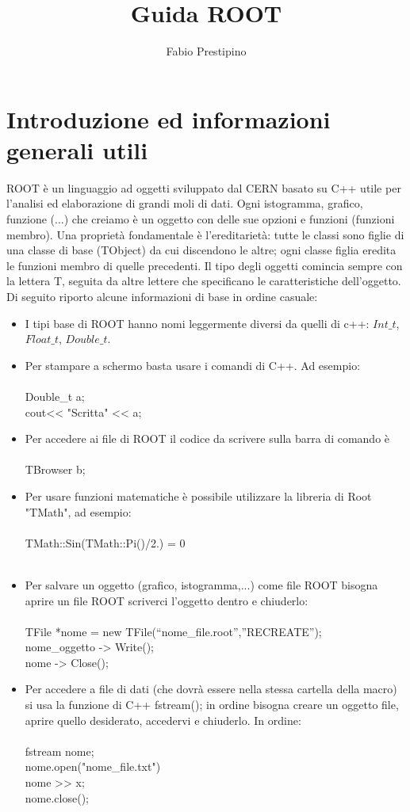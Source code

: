 \documentclass[10pt,a4paper]{article}
\author{Fabio Prestipino}
\title{Guida ROOT}
\begin{document}
	
	\maketitle
	\tableofcontents
	\newpage
\section{Introduzione ed informazioni generali utili}
ROOT è un linguaggio ad oggetti sviluppato dal CERN basato su C++ utile per l'analisi ed elaborazione di grandi moli di dati. Ogni istogramma, grafico, funzione (...) che creiamo è un oggetto con delle sue opzioni e funzioni (funzioni membro). Una proprietà fondamentale è l'ereditarietà: tutte le classi sono figlie di una classe di base (TObject) da cui discendono le altre; ogni classe figlia eredita le funzioni membro di quelle precedenti. Il tipo degli oggetti comincia sempre con la lettera T, seguita da altre lettere che specificano le caratteristiche dell'oggetto. Di seguito riporto alcune informazioni di base in ordine casuale:
\begin{itemize}
\item I tipi base di ROOT hanno nomi leggermente diversi da quelli di c++: \(Int\_t\), \(Float\_t\), \(Double\_t\).\\
\item Per stampare a schermo basta usare i comandi di C++. Ad esempio:\\\\
Double\_t a;\\
cout<< "Scritta" << a;\\
\item Per accedere ai file di ROOT il codice da scrivere sulla barra di comando è\\\\
TBrowser b;\\
\item Per usare funzioni matematiche è possibile utilizzare la libreria di Root "TMath", ad esempio:\\\\
TMath::Sin(TMath::Pi()/2.) = 0\\\\ 
\item Per salvare un oggetto (grafico, istogramma,...) come file ROOT bisogna aprire un file ROOT scriverci l'oggetto dentro e chiuderlo:\\\\
TFile *nome = new TFile(“nome\_file.root”,”RECREATE”);\\
nome\_oggetto -> Write();\\
nome -> Close();\\
\item Per accedere a file di dati (che dovrà essere nella stessa cartella della macro) si usa la funzione di C++ fstream(); in ordine bisogna creare un oggetto file, aprire quello desiderato, accedervi e chiuderlo. In ordine:\\\\
 fstream nome;\\
 nome.open("nome\_file.txt")\\
 nome >> x;\\
 nome.close();\\\\
\end{itemize}
\end{document}
